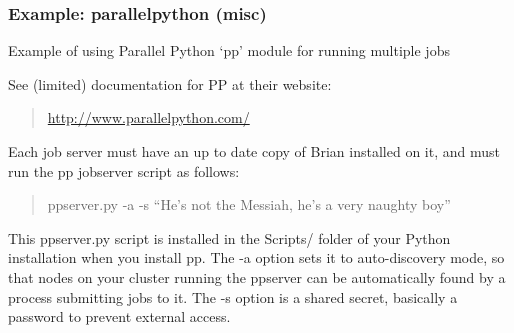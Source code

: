 \documentclass[letterpaper,10pt,english]{manual}
\begin{document}
\hypertarget{index-56}{}\subsubsection{Example: parallelpython (misc)}

Example of using Parallel Python `pp' module for running multiple jobs

See (limited) documentation for PP at their website:
\begin{quote}

\href{http://www.parallelpython.com/}{http://www.parallelpython.com/}
\end{quote}

Each job server must have an up to date copy of Brian installed on it, and
must run the pp jobserver script as follows:
\begin{quote}

ppserver.py -a -s ``He's not the Messiah, he's a very naughty boy''
\end{quote}

This ppserver.py script is installed in the Scripts/ folder of your
Python installation when you install pp. The -a option sets it to
auto-discovery mode, so that nodes on your cluster running the ppserver
can be automatically found by a process submitting jobs to it. The -s
option is a shared secret, basically a password to prevent external
access.
\end{document}
